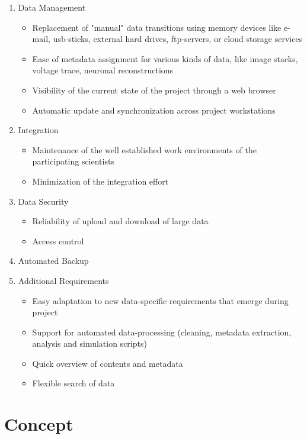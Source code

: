 \documentclass{frontiersSCNS} %
\begin{document}
\begin{enumerate}
\item Data Management
    \begin{itemize}
    \item Replacement of "manual" data transitions using memory devices like
    e-mail, usb-sticks, external hard drives, ftp-servers, or cloud storage
    services
    \item Ease of metadata assignment for various kinds of data, like image stacks,
    voltage trace, neuronal reconstructions
    \item Visibility of  the current state of the project through a web browser
    \item Automatic update and synchronization across project workstations
    \end{itemize}
\item Integration
    \begin{itemize}
    \item Maintenance of the well established work environments of the participating scientists
    \item Minimization of the integration effort
    \end{itemize}
\item Data Security
    \begin{itemize}
    \item Reliability of upload and download of large data
    \item Access control
    \end{itemize}
\item Automated Backup
\item Additional Requirements
    \begin{itemize}
    \item Easy adaptation to new data-specific requirements that emerge during project
    \item Support for automated data-processing (cleaning, metadata extraction,
    analysis and simulation scripts)
    \item Quick overview of contents and metadata
    \item Flexible search of data
    \end{itemize}
\end{enumerate}



\section{Concept}
\end{document}

